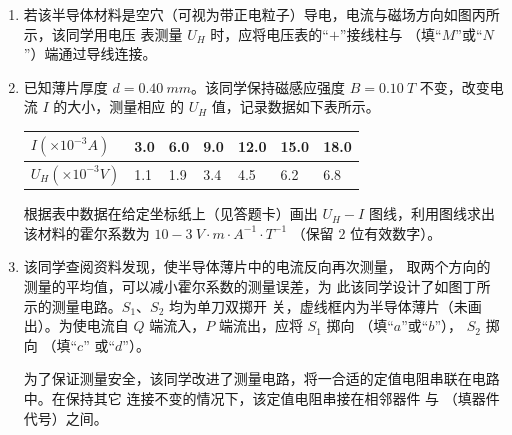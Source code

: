 \begin{enumerate}
\begin{figure}[h!]
\end{figure}


\begin{enumerate}
\item
若该半导体材料是空穴（可视为带正电粒子）导电，电流与磁场方向如图丙所示，该同学用电压
表测量 $ U_H $ 时，应将电压表的“$ + $”接线柱与 \underlinegap （填“$ M $”或“$ N $”）端通过导线连接。


\item 
已知薄片厚度 $ d=0.40 \ mm $。该同学保持磁感应强度 $ B=0.10 \ T $ 不变，改变电流 $ I $ 的大小，测量相应
的 $ U_H $ 值，记录数据如下表所示。
\begin{table}[h!]
\centering 
\begin{tabular}{|l|l|l|l|l|l|l|}
\hline$I\left(\times 10^{-3} A\right)$ & 3.0 & 6.0 & 9.0 & 12.0 & 15.0 & 18.0 \\
\hline$U_{H}\left(\times 10^{-3} V\right)$ & 1.1 & 1.9 & 3.4 & 4.5 & 6.2 & 6.8 \\
\hline
\end{tabular}
\end{table} 


根据表中数据在给定坐标纸上（见答题卡）画出 $ U_H - I $ 图线，利用图线求出该材料的霍尔系数为 \underlinegap 
$ 10-3 \ V \cdot m \cdot A^{-1} \cdot T^{-1} $ （保留 $ 2 $ 位有效数字）。


\item 
该同学查阅资料发现，使半导体薄片中的电流反向再次测量，
取两个方向的测量的平均值，可以减小霍尔系数的测量误差，为
此该同学设计了如图丁所示的测量电路。$ S_{1} $、$ S_{2} $ 均为单刀双掷开
关，虚线框内为半导体薄片（未画出）。为使电流自 $ Q $ 端流入，$ P $
端流出，应将 $ S_{1} $ 掷向 \underlinegap （填“$ a $”或“$ b $”）， $ S_{2} $ 掷向 \underlinegap （填“$ c $”
或“$ d $”）。



为了保证测量安全，该同学改进了测量电路，将一合适的定值电阻串联在电路中。在保持其它
连接不变的情况下，该定值电阻串接在相邻器件 \underlinegap 与 \underlinegap （填器件代号）之间。


\end{enumerate}





\end{enumerate}
